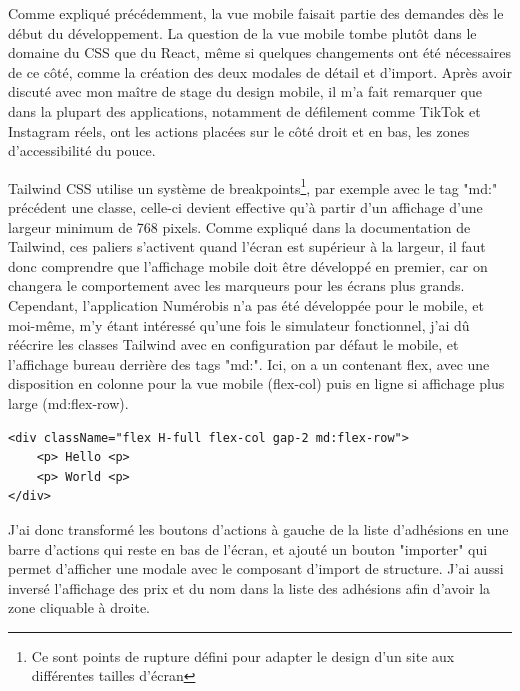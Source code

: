 \documentclass[a4paper,12pt]{report}
\begin{document}
Comme expliqué précédemment, la vue mobile faisait partie des demandes dès le début du développement. La question de la vue mobile tombe plutôt dans le domaine du CSS que du React, même si quelques changements ont été nécessaires de ce côté, comme la création des deux modales de détail et d'import. Après avoir discuté avec mon maître de stage du design mobile, il m'a fait remarquer que dans la plupart des applications, notamment de défilement comme TikTok et Instagram réels, ont les actions placées sur le côté droit et en bas, les zones d'accessibilité du pouce.

Tailwind CSS utilise un système de breakpoints\footnote{Ce sont points de rupture défini pour adapter le design d’un site aux différentes tailles d’écran}, par exemple avec le tag "md:" précédent une classe, celle-ci devient effective qu'à partir d'un affichage d'une largeur minimum de 768 pixels. Comme expliqué dans la documentation de Tailwind, ces paliers s'activent quand l'écran est supérieur à la largeur, il faut donc comprendre que l'affichage mobile doit être développé en premier, car on changera le comportement avec les marqueurs pour les écrans plus grands. Cependant, l'application Numérobis n'a pas été développée pour le mobile, et moi-même, m'y étant intéressé qu'une fois le simulateur fonctionnel, j'ai dû réécrire les classes Tailwind avec en configuration par défaut le mobile, et l'affichage bureau derrière des tags "md:". Ici, on a un contenant flex, avec une disposition en colonne pour la vue mobile (flex-col) puis en ligne si affichage plus large (md:flex-row).


\begin{verbatim}
<div className="flex H-full flex-col gap-2 md:flex-row">
    <p> Hello <p>
    <p> World <p>
</div>
\end{verbatim}


J'ai donc transformé les boutons d'actions à gauche de la liste d'adhésions en une barre d'actions qui reste en bas de l'écran, et ajouté un bouton "importer" qui permet d'afficher une modale avec le composant d'import de structure. J'ai aussi inversé l'affichage des prix et du nom dans la liste des adhésions afin d'avoir la zone cliquable à droite.
\end{document}
